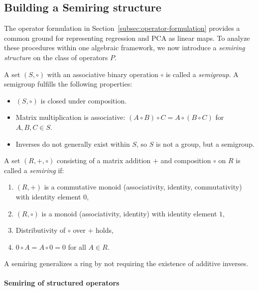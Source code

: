 \subsection{Building a Semiring structure}
\label{subsec:semiring-structure}

The operator formulation in Section~\ref{subsec:operator-formulation} provides a common ground for representing regression and PCA as linear maps. To analyze these procedures within one algebraic framework, we now introduce a \emph{semiring structure} on the class of operators $P$.

\begin{defn}[Semigroup]
A set $(S, \circ)$ with an associative binary operation $\circ$ is called a \emph{semigroup}. A semigroup fulfills the following properties:

\begin{itemize}
    \item $(S, \circ)$ is closed under composition.
    \item Matrix multiplication is associative: $(A \circ B) \circ C = A \circ (B \circ C)$ for $A, B, C \in S$.
    \item Inverses do not generally exist within $S$, so $S$ is not a group, but a semigroup.
\end{itemize}
\end{defn}

\begin{defn}[Semiring]
A set $(R, +, \circ)$  consisting of a matrix addition $+$ and composition $\circ$ on $R$ is called a \emph{semiring} if:
\begin{enumerate}
    \item $(R, +)$ is a commutative monoid (associativity, identity, commutativity) with identity element $0$,
    \item $(R, \circ)$ is a monoid (associativity, identity) with identity element $1$,
    \item Distributivity of $\circ$ over $+$ holds,
    \item $0 \circ A = A \circ 0 = 0$ for all $A \in R$.
\end{enumerate}

A semiring generalizes a ring by not requiring the existence of additive inverses.
\end{defn}

\paragraph{Semiring of structured operators}

